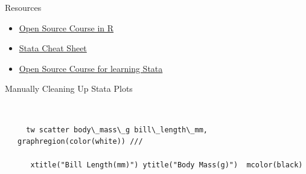 \documentclass[shownotes,12pt, aspectratio=169]{beamer}
\begin{document}
\begin{frame}[t]{Resources}
  \begin{itemize}
    \item \href{https://datavizm20.classes.andrewheiss.com/}{Open Source Course in R}
    \item \href{https://www.stata.com/bookstore/statacheatsheets.pdf}{Stata Cheat Sheet}
    \item \href{http://geocenter.github.io/StataTraining/}{Open Source Course for learning Stata}
  \end{itemize}
\end{frame}
\begin{frame}[t]{Manually Cleaning Up Stata Plots}
\begin{columns}
\begin{column}[T]{.5\textwidth}
  \begin{center}
\end{center}
\end{column}
\hfill
\begin{column}[T]{.5\textwidth}
\begin{verbatim}

  tw scatter body\_mass\_g bill\_length\_mm, graphregion(color(white)) ///

   xtitle("Bill Length(mm)") ytitle("Body Mass(g)")  mcolor(black)
\end{verbatim}

\end{column}
\end{columns}

\end{frame}
\transreplace
\end{document}
